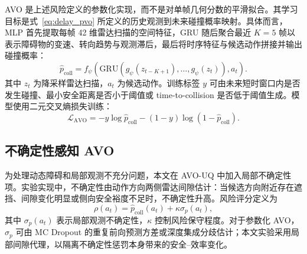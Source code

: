 \documentclass[UTF8,10pt,a4paper,twocolumn]{ctexart}
\begin{document}
AVO 是上述风险定义的参数化实现，而不是对单帧几何分数的平滑拟合。其学习目标是式~\ref{eq:delay_pvo} 所定义的历史观测到未来碰撞概率映射。具体而言，MLP 首先提取每帧 42 维雷达扫描的空间特征，GRU 随后聚合最近 $K=5$ 帧以表示障碍物的变速、转向趋势与观测滞后，最后将时序特征与候选动作拼接并输出碰撞概率：
\begin{equation}
    \hat{p}_{\mathrm{coll}} =
    f_{\psi}\left(\mathrm{GRU}\left(g_{\psi}(z_{t-K+1}),\ldots,g_{\psi}(z_t)\right), a_t\right).
    \label{eq:pvo}
\end{equation}
其中 $z_t$ 为降采样雷达扫描，$a_t$ 为候选动作。训练标签 $y$ 可由未来短时窗口内是否发生碰撞、最小安全距离是否小于阈值或 time-to-collision 是否低于阈值生成。模型使用二元交叉熵损失训练：
\begin{equation}
    \mathcal{L}_{\mathrm{AVO}} =
    -y \log \hat{p}_{\mathrm{coll}} - (1-y)\log(1-\hat{p}_{\mathrm{coll}}).
\end{equation}

\subsection{不确定性感知 AVO}

为处理动态障碍和局部观测不充分问题，本文在 AVO-UQ 中加入局部不确定性项。实验实现中，不确定性由动作方向两侧雷达间隙估计：当候选方向附近存在遮挡、间隙变化明显或侧向安全裕度不足时，不确定性升高。风险评分定义为
\begin{equation}
    \rho(a_t) = \hat{p}_{\mathrm{coll}}(a_t) + \kappa \sigma_p(a_t),
\end{equation}
其中 $\sigma_p(a_t)$ 表示局部观测不确定性，$\kappa$ 控制风险保守程度。对于参数化 AVO，$\sigma_p$ 可由 MC Dropout 的重复前向预测方差或深度集成分歧估计；本文实验采用局部间隙代理，以隔离不确定性惩罚本身带来的安全--效率变化。
\end{document}
